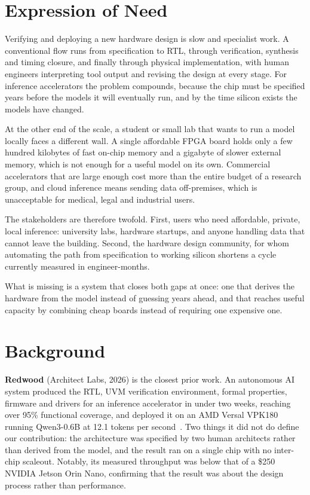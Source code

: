 \documentclass[conference,10pt]{IEEEtran}
\begin{document}
\section{Expression of Need}
Verifying and deploying a new hardware design is slow and specialist work. A
conventional flow runs from specification to RTL, through verification, synthesis
and timing closure, and finally through physical implementation, with human
engineers interpreting tool output and revising the design at every stage. For
inference accelerators the problem compounds, because the chip must be specified
years before the models it will eventually run, and by the time silicon exists the
models have changed.

At the other end of the scale, a student or small lab that wants to run a model
locally faces a different wall. A single affordable FPGA board holds only a few
hundred kilobytes of fast on-chip memory and a gigabyte of slower external memory,
which is not enough for a useful model on its own. Commercial accelerators that are
large enough cost more than the entire budget of a research group, and cloud
inference means sending data off-premises, which is unacceptable for medical,
legal and industrial users.

The stakeholders are therefore twofold. First, users who need affordable, private,
local inference: university labs, hardware startups, and anyone handling data that
cannot leave the building. Second, the hardware design community, for whom
automating the path from specification to working silicon shortens a cycle
currently measured in engineer-months.

What is missing is a system that closes both gaps at once: one that derives the
hardware from the model instead of guessing years ahead, and that reaches useful
capacity by combining cheap boards instead of requiring one expensive one.

\section{Background}
\textbf{Redwood} (Architect Labs, 2026) is the closest prior work. An autonomous AI
system produced the RTL, UVM verification environment, formal properties, firmware
and drivers for an inference accelerator in under two weeks, reaching over 95\%
functional coverage, and deployed it on an AMD Versal VPK180 running Qwen3-0.6B at
12.1 tokens per second~\cite{redwood}. Two things it did not do define our
contribution: the architecture was specified by two human architects rather than
derived from the model, and the result ran on a single chip with no inter-chip
scaleout. Notably, its measured throughput was below that of a \$250 NVIDIA Jetson
Orin Nano, confirming that the result was about the design process rather than
performance.
\end{document}

